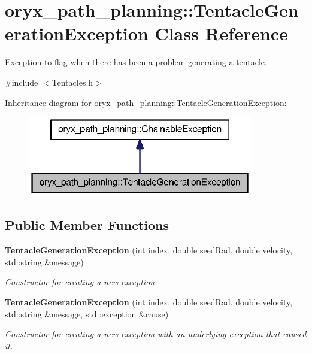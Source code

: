 \section{oryx\-\_\-path\-\_\-planning\-:\-:\-Tentacle\-Generation\-Exception \-Class \-Reference}
\label{classoryx__path__planning_1_1TentacleGenerationException}


\-Exception to flag when there has been a problem generating a tentacle.  




{\ttfamily \#include $<$\-Tentacles.\-h$>$}



\-Inheritance diagram for oryx\-\_\-path\-\_\-planning\-:\-:\-Tentacle\-Generation\-Exception\-:
\nopagebreak
\begin{figure}[H]
\begin{center}
\leavevmode
\includegraphics[width=278pt]{classoryx__path__planning_1_1TentacleGenerationException__inherit__graph}
\end{center}
\end{figure}
\subsection*{\-Public \-Member \-Functions}
\begin{DoxyCompactItemize}
\item 
{\bf \-Tentacle\-Generation\-Exception} (int index, double seed\-Rad, double velocity, std\-::string \&message)
\begin{DoxyCompactList}\small\item\em \-Constructor for creating a new exception. \end{DoxyCompactList}\item 
{\bf \-Tentacle\-Generation\-Exception} (int index, double seed\-Rad, double velocity, std\-::string \&message, std\-::exception \&cause)
\begin{DoxyCompactList}\small\item\em \-Constructor for creating a new exception with an underlying exception that caused it. \end{DoxyCompactList}\end{DoxyCompactItemize}
